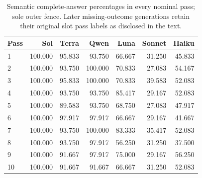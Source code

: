 \documentclass[a4paper,preprint,12pt,numbers,nopreprintline]{elsarticle}
\begin{document}
\begin{table}[htbp]\centering\scriptsize
\caption{Semantic complete-answer percentages in every nominal pass; sole outer fence. Later missing-outcome generations retain their original slot pass labels as disclosed in the text.}\label{tab:rounds-semantic-framing_sensitivity}
\setlength{\tabcolsep}{3pt}
\begin{tabular}{lrrrrrr}\toprule
Pass & Sol & Terra & Qwen & Luna & Sonnet & Haiku\\\midrule
1 & 100.000 & 95.833 & 93.750 & 66.667 & 31.250 & 45.833\\
2 & 100.000 & 93.750 & 100.000 & 70.833 & 27.083 & 54.167\\
3 & 100.000 & 95.833 & 100.000 & 70.833 & 39.583 & 52.083\\
4 & 100.000 & 93.750 & 93.750 & 85.417 & 29.167 & 52.083\\
5 & 100.000 & 89.583 & 93.750 & 68.750 & 27.083 & 47.917\\
6 & 100.000 & 97.917 & 97.917 & 66.667 & 29.167 & 41.667\\
7 & 100.000 & 93.750 & 100.000 & 83.333 & 35.417 & 52.083\\
8 & 100.000 & 93.750 & 97.917 & 56.250 & 31.250 & 37.500\\
9 & 100.000 & 91.667 & 97.917 & 75.000 & 29.167 & 56.250\\
10 & 100.000 & 91.667 & 91.667 & 66.667 & 31.250 & 52.083\\
\bottomrule\end{tabular}
\end{table}
\end{document}
